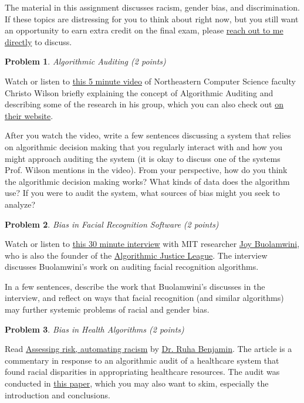 \documentclass[11pt]{article}
\theoremstyle{theorem}
\newtheorem{prob}{Problem}
\newcommand{\solution}{\medskip\noindent{\color{DarkBlue}\textbf{Solution:}}}
\begin{document}
		The material in this assignment discusses racism, gender bias, and discrimination. If these topics are distressing for you to think about right now, but you still want an opportunity to earn extra credit on the final exam, please \href{mailto:timothylarock@gmail.com}{reach out to me directly} to discuss.
		
		\newpage
		\begin{prob} Algorithmic Auditing (2 points) \end{prob}
		
			Watch or listen to \href{https://www.youtube.com/watch?v=gxsKVDyX2ak}{this 5 minute video} of Northeastern Computer Science faculty Christo Wilson briefly explaining the concept of Algorithmic Auditing and describing some of the research in his group, which you can also check out \href{https://personalization.ccs.neu.edu/}{on their website}. 
			
			After you watch the video, write a few sentences discussing a system that relies on algorithmic decision making that you regularly interact with and how you might approach auditing the system (it is okay to discuss one of the systems Prof. Wilson mentions in the video). From your perspective, how do you think the algorithmic decision making works? What kinds of data does the algorithm use? If you were to audit the system, what sources of bias might you seek to analyze?
			
			\solution
			
		\newpage 
		\begin{prob} Bias in Facial Recognition Software (2 points) \end{prob}
			Watch or listen to \href{https://www.youtube.com/watch?v=hwHnXdoSSFY}{this 30 minute interview} with MIT researcher \href{https://www.poetofcode.com/}{Joy Buolamwini},  who is also the founder of the \href{https://www.ajlunited.org/}{Algorithmic Justice League}. The interview discusses Buolamwini's work on auditing facial recognition algorithms. 
			
			In a few sentences, describe the work that Buolamwini's discusses in the interview, and reflect on ways that facial recognition (and similar algorithms) may further systemic problems of racial and gender bias.
			
			\solution
		
		\newpage
		\begin{prob} Bias in Health Algorithms (2 points) \end{prob}
			Read \href{https://www.dropbox.com/s/tx7vnpvwwz9ohig/421.full.pdf?dl=0}{Assessing risk, automating racism} by \href{https://www.ruhabenjamin.com/}{Dr. Ruha Benjamin}. The article is a commentary in response to an algorithmic audit of a healthcare system that found racial disparities in appropriating healthcare resources. The audit was conducted in \href{https://www.dropbox.com/s/x1j8nnvmxn4t94d/447.full.pdf?dl=0}{this paper}, which you may also want to skim, especially the introduction and conclusions.
			
\end{document}
